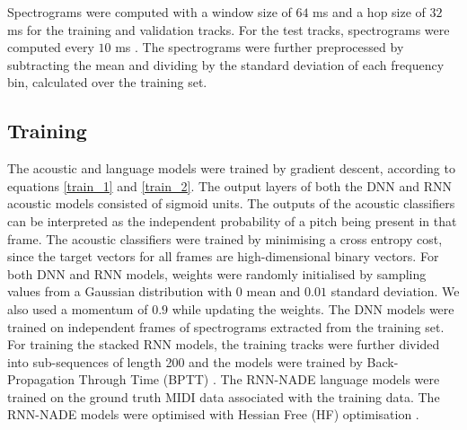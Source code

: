 \documentclass{article}
\begin{document}
\begin{table}[htbp]
\caption{Additional evaluation metrics for the best models}
\end{table}
Spectrograms were computed with a window size of $64$ ms and a hop size of $32$ ms for the training and validation tracks. For the test tracks, spectrograms were computed every $10$ ms \cite{bay2009evaluation}. The spectrograms were further preprocessed by subtracting the mean and dividing by the standard deviation of each frequency bin, calculated over the training set. 


\subsection{Training}


The acoustic and language models were trained by gradient descent, according to equations \ref{train_1} and \ref{train_2}. The output layers of both the DNN and RNN acoustic models consisted of sigmoid units. The outputs of the acoustic classifiers can be interpreted as the independent probability of a pitch being present in that frame. The acoustic classifiers were trained by minimising a cross entropy cost, since the target vectors for all frames are high-dimensional binary vectors. For both DNN and RNN models, weights were randomly initialised by sampling values from a Gaussian distribution with $0$ mean and $0.01$ standard deviation. We also used a momentum of $0.9$ while updating the weights. The DNN models were trained on independent frames of spectrograms extracted from the training set. For training the stacked RNN models, the training tracks were further divided into sub-sequences of length 200 and the models were trained by Back-Propagation Through Time (BPTT) . The RNN-NADE language models were 
trained on the ground truth MIDI data associated with the training data. The RNN-NADE models were optimised with Hessian Free (HF) optimisation \cite{Martens2011}. 
\end{document}
